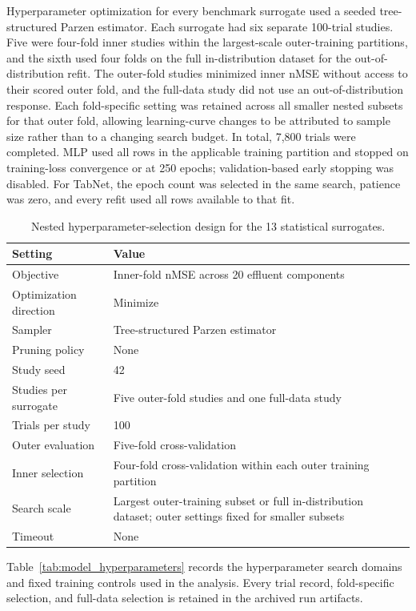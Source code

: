 \documentclass[a4paper,fleqn]{cas-sc}
\begin{document}
Hyperparameter optimization for every benchmark surrogate used a seeded tree-structured Parzen estimator. Each surrogate had six separate 100-trial studies. Five were four-fold inner studies within the largest-scale outer-training partitions, and the sixth used four folds on the full in-distribution dataset for the out-of-distribution refit. The outer-fold studies minimized inner nMSE without access to their scored outer fold, and the full-data study did not use an out-of-distribution response. Each fold-specific setting was retained across all smaller nested subsets for that outer fold, allowing learning-curve changes to be attributed to sample size rather than to a changing search budget. In total, 7,800 trials were completed. MLP used all rows in the applicable training partition and stopped on training-loss convergence or at 250 epochs; validation-based early stopping was disabled. For TabNet, the epoch count was selected in the same search, patience was zero, and every refit used all rows available to that fit.

\begin{table}[htbp]
\centering
\caption{Nested hyperparameter-selection design for the 13 statistical surrogates.}
\label{tab:optuna_design}
\scriptsize
\begin{tabular}{ll}
\hline
Setting & Value \\
\hline
Objective & Inner-fold nMSE across 20 effluent components \\
Optimization direction & Minimize \\
Sampler & Tree-structured Parzen estimator \\
Pruning policy & None \\
Study seed & 42 \\
Studies per surrogate & Five outer-fold studies and one full-data study \\
Trials per study & 100 \\
Outer evaluation & Five-fold cross-validation \\
Inner selection & Four-fold cross-validation within each outer training partition \\
Search scale & Largest outer-training subset or full in-distribution dataset; outer settings fixed for smaller subsets \\
Timeout & None \\
\hline
\end{tabular}
\end{table}

Table~\ref{tab:model_hyperparameters} records the hyperparameter search domains and fixed training controls used in the analysis. Every trial record, fold-specific selection, and full-data selection is retained in the archived run artifacts.
\end{document}
